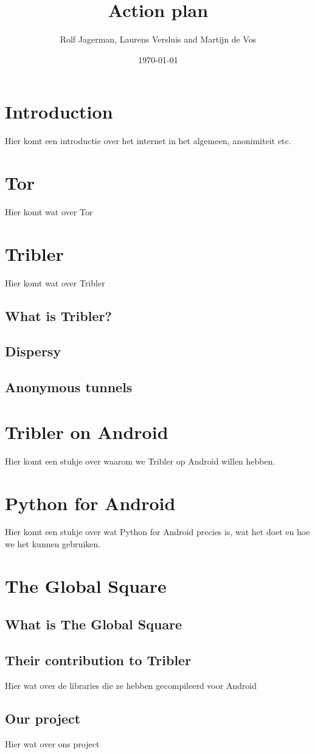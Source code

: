 \documentclass[11pt]{article}
\title{Action plan}
\author{Rolf Jagerman, Laurens Versluis and Martijn de Vos}
\date{\today}
\begin{document}
\maketitle

\pagebreak

\section{Introduction}
Hier komt een introductie over het internet in het algemeen, anonimiteit etc.

\section{Tor}
Hier komt wat over Tor

\section{Tribler}
Hier komt wat over Tribler

\subsection{What is Tribler?}

\subsection{Dispersy}

\subsection{Anonymous tunnels}

\section{Tribler on Android}
Hier komt een stukje over waarom we Tribler op Android willen hebben.

\section{Python for Android}
Hier komt een stukje over wat Python for Android precies is, wat het doet en hoe we het kunnen gebruiken.

\section{The Global Square}

\subsection{What is The Global Square}

\subsection{Their contribution to Tribler}
Hier wat over de libraries die ze hebben gecompileerd voor Android

\subsection{Our project}
Hier wat over ons project
\end{document}

